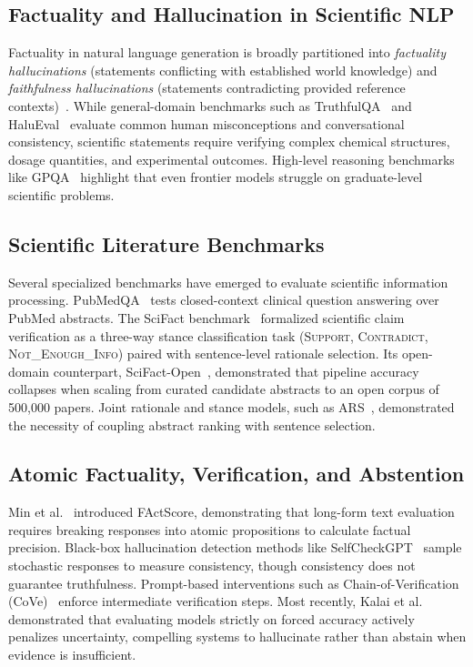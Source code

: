 \documentclass[10pt,journal,compsoc]{IEEEtran}
\begin{document}
\subsection{Factuality and Hallucination in Scientific NLP}
Factuality in natural language generation is broadly partitioned into \textit{factuality hallucinations} (statements conflicting with established world knowledge) and \textit{faithfulness hallucinations} (statements contradicting provided reference contexts)~\cite{huang2025survey, wang2024factuality}. While general-domain benchmarks such as TruthfulQA~\cite{lin2022truthfulqa} and HaluEval~\cite{li2023halueval} evaluate common human misconceptions and conversational consistency, scientific statements require verifying complex chemical structures, dosage quantities, and experimental outcomes. High-level reasoning benchmarks like GPQA~\cite{rein2023gpqa} highlight that even frontier models struggle on graduate-level scientific problems.

\subsection{Scientific Literature Benchmarks}
Several specialized benchmarks have emerged to evaluate scientific information processing. PubMedQA~\cite{jin2019pubmedqa} tests closed-context clinical question answering over PubMed abstracts. The SciFact benchmark~\cite{wadden2020fact} formalized scientific claim verification as a three-way stance classification task (\textsc{Support}, \textsc{Contradict}, \textsc{Not\_Enough\_Info}) paired with sentence-level rationale selection. Its open-domain counterpart, SciFact-Open~\cite{wadden2022scifact}, demonstrated that pipeline accuracy collapses when scaling from curated candidate abstracts to an open corpus of 500,000 papers. Joint rationale and stance models, such as ARS~\cite{zhang2021abstract}, demonstrated the necessity of coupling abstract ranking with sentence selection.

\subsection{Atomic Factuality, Verification, and Abstention}
Min et al.~\cite{min2023factscore} introduced FActScore, demonstrating that long-form text evaluation requires breaking responses into atomic propositions to calculate factual precision. Black-box hallucination detection methods like SelfCheckGPT~\cite{manakul2023selfcheckgpt} sample stochastic responses to measure consistency, though consistency does not guarantee truthfulness. Prompt-based interventions such as Chain-of-Verification (CoVe)~\cite{dhuliawala2023chain} enforce intermediate verification steps. Most recently, Kalai et al.~\cite{kalai2026evaluating} demonstrated that evaluating models strictly on forced accuracy actively penalizes uncertainty, compelling systems to hallucinate rather than abstain when evidence is insufficient.
\end{document}
